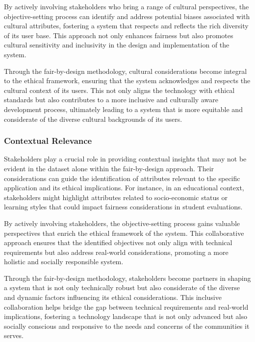 \documentclass[12pt,a4paper,openright,twoside]{book}
\begin{document}
By actively involving stakeholders who bring a range of cultural perspectives, the objective-setting process can identify and address potential biases associated with cultural attributes, fostering a system that respects and reflects the rich diversity of its user base. This approach not only enhances fairness but also promotes cultural sensitivity and inclusivity in the design and implementation of the system.

Through the fair-by-design methodology, cultural considerations become integral to the ethical framework, ensuring that the system acknowledges and respects the cultural context of its users. This not only aligns the technology with ethical standards but also contributes to a more inclusive and culturally aware development process, ultimately leading to a system that is more equitable and considerate of the diverse cultural backgrounds of its users.

\subsubsection{Contextual Relevance}

Stakeholders play a crucial role in providing contextual insights that may not be evident in the dataset alone within the fair-by-design approach. Their considerations can guide the identification of attributes relevant to the specific application and its ethical implications. For instance, in an educational context, stakeholders might highlight attributes related to socio-economic status or learning styles that could impact fairness considerations in student evaluations.

By actively involving stakeholders, the objective-setting process gains valuable perspectives that enrich the ethical framework of the system. This collaborative approach ensures that the identified objectives not only align with technical requirements but also address real-world considerations, promoting a more holistic and socially responsible system.

Through the fair-by-design methodology, stakeholders become partners in shaping a system that is not only technically robust but also considerate of the diverse and dynamic factors influencing its ethical considerations. This inclusive collaboration helps bridge the gap between technical requirements and real-world implications, fostering a technology landscape that is not only advanced but also socially conscious and responsive to the needs and concerns of the communities it serves.
\end{document}
